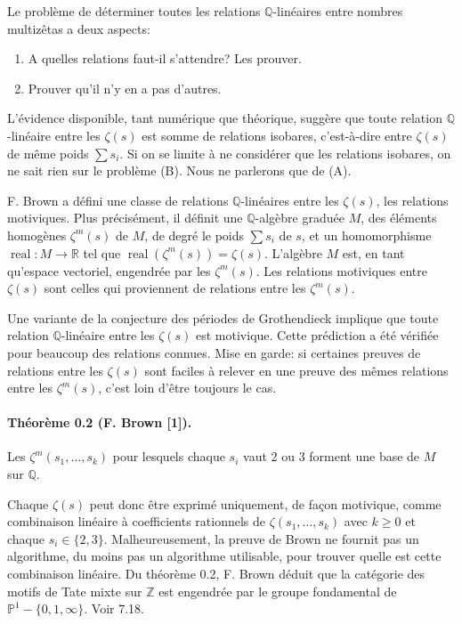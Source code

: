 \documentclass[10pt]{article}
\newcommand{\Q}{\mathbb Q}
\newcommand{\Z}{\mathbb Z}
\newcommand{\R}{\mathbb R}
\newcommand{\PP}{\mathbb P}
\newcommand{\real}{\operatorname{real}}
\begin{document}
Le problème de déterminer toutes les relations $\Q$-linéaires entre nombres multizêtas a deux aspects:
\begin{enumerate}[label=(\Alph*)]
\item A quelles relations faut-il s'attendre? Les prouver.
\item Prouver qu'il n'y en a pas d'autres.
\end{enumerate}

L'évidence disponible, tant numérique que théorique, suggère que toute relation $\Q$-linéaire entre les $\zeta(s)$ est somme de relations isobares, c'est-à-dire entre $\zeta(s)$ de même poids $\sum s_i$. Si on se limite à ne considérer que les relations isobares, on ne sait rien sur le problème (B). Nous ne parlerons que de (A).

F. Brown a défini une classe de relations $\Q$-linéaires entre les $\zeta(s)$, les relations motiviques. Plus précisément, il définit une $\Q$-algèbre graduée $M$, des éléments homogènes $\zeta^m(s)$ de $M$, de degré le poids $\sum s_i$ de $s$, et un homomorphisme $\real:M\to\R$ tel que $\real(\zeta^m(s))=\zeta(s)$. L'algèbre $M$ est, en tant qu'espace vectoriel, engendrée par les $\zeta^m(s)$. Les relations motiviques entre $\zeta(s)$ sont celles qui proviennent de relations entre les $\zeta^m(s)$.

Une variante de la conjecture des périodes de Grothendieck implique que toute relation $\Q$-linéaire entre les $\zeta(s)$ est motivique. Cette prédiction a été vérifiée pour beaucoup des relations connues. Mise en garde: si certaines preuves de relations entre les $\zeta(s)$ sont faciles à relever en une preuve des mêmes relations entre les $\zeta^m(s)$, c'est loin d'être toujours le cas.

\paragraph{Théorème 0.2 (F. Brown [1]).}
Les $\zeta^m(s_1,\ldots,s_k)$ pour lesquels chaque $s_i$ vaut $2$ ou $3$ forment une base de $M$ sur $\Q$.

Chaque $\zeta(s)$ peut donc être exprimé uniquement, de façon motivique, comme combinaison linéaire à coefficients rationnels de $\zeta(s_1,\ldots,s_k)$ avec $k\geq0$ et chaque $s_i\in\{2,3\}$. Malheureusement, la preuve de Brown ne fournit pas un algorithme, du moins pas un algorithme utilisable, pour trouver quelle est cette combinaison linéaire. Du théorème 0.2, F. Brown déduit que la catégorie des motifs de Tate mixte sur $\Z$ est engendrée par le groupe fondamental de $\PP^1-\{0,1,\infty\}$. Voir 7.18.
\end{document}
